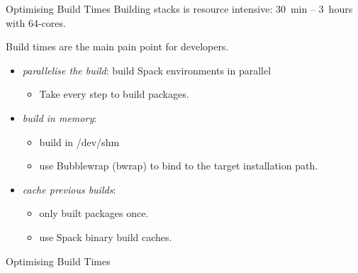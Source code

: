 \documentclass[aspectratio=43]{beamer}
\begin{document}
\begin{frame}[fragile]{Optimising Build Times}
    Building stacks is resource intensive: 30~min -- 3~hours with 64-cores.

    \vspace{10pt}

    Build times are the main pain point for developers.

    \vspace{10pt}

    \begin{itemize}
        \item \emph{parallelise the build}: build Spack environments in parallel
        \begin{itemize}
            \item Take every step to build packages.
        \end{itemize}
        \item \emph{build in memory}:
        \begin{itemize}
            \item build in /dev/shm
            \item use Bubblewrap (bwrap) to bind to the target installation path.
        \end{itemize}
        \item \emph{cache previous builds}:
        \begin{itemize}
            \item only built packages once.
            \item use Spack binary build caches.
        \end{itemize}
    \end{itemize}
\end{frame}

\begin{frame}[fragile]{Optimising Build Times}
    \begin{center}
        
    \end{center}
\end{frame}


\end{document}
